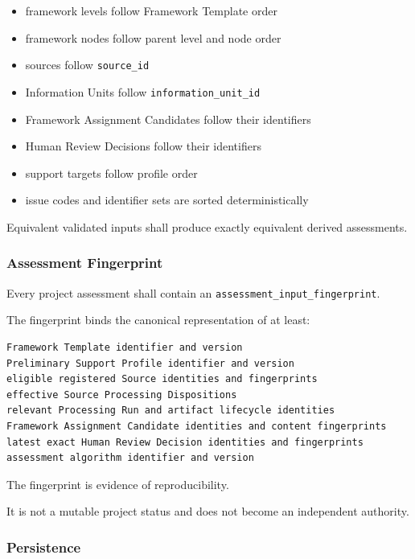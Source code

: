 \begin{itemize}
\tightlist
\item
  framework levels follow Framework Template order
\item
  framework nodes follow parent level and node order
\item
  sources follow \texttt{source\_id}
\item
  Information Units follow \texttt{information\_unit\_id}
\item
  Framework Assignment Candidates follow their identifiers
\item
  Human Review Decisions follow their identifiers
\item
  support targets follow profile order
\item
  issue codes and identifier sets are sorted deterministically
\end{itemize}

Equivalent validated inputs shall produce exactly equivalent derived assessments.

\hypertarget{assessment-fingerprint}{%
\subsubsection{Assessment Fingerprint}\label{assessment-fingerprint}}

Every project assessment shall contain an \texttt{assessment\_input\_fingerprint}.

The fingerprint binds the canonical representation of at least:

\begin{verbatim}
Framework Template identifier and version
Preliminary Support Profile identifier and version
eligible registered Source identities and fingerprints
effective Source Processing Dispositions
relevant Processing Run and artifact lifecycle identities
Framework Assignment Candidate identities and content fingerprints
latest exact Human Review Decision identities and fingerprints
assessment algorithm identifier and version
\end{verbatim}

The fingerprint is evidence of reproducibility.

It is not a mutable project status and does not become an independent authority.

\hypertarget{persistence}{%
\subsubsection{Persistence}\label{persistence}}

